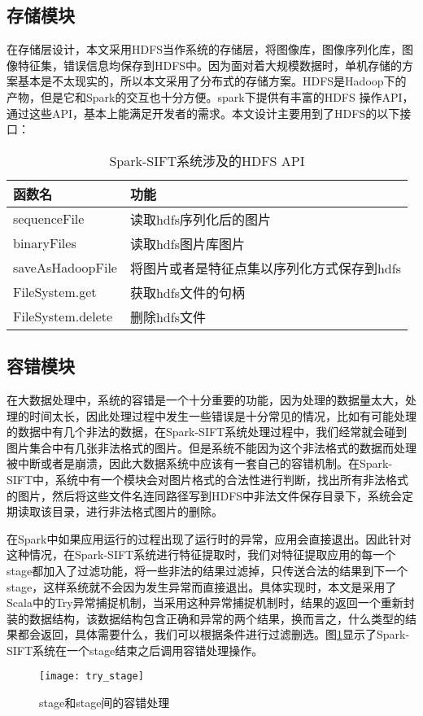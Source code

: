 \subsection{存储模块}
在存储层设计，本文采用HDFS当作系统的存储层，将图像库，图像序列化库，图像特征集，错误信息均保存到HDFS中。因为面对着大规模数据时，单机存储的方案基本是不太现实的，所以本文采用了分布式的存储方案。HDFS是Hadoop下的产物，但是它和Spark的交互也十分方便。spark下提供有丰富的HDFS 操作API，通过这些API，基本上能满足开发者的需求。本文设计主要用到了HDFS的以下接口：
\begin{table}[h] %
\caption{Spark-SIFT系统涉及的HDFS API} %
\centering
\label{tab:HDFS_API}
\begin{tabular}{p{3cm}|p{8cm}} %
\hline
\hline
函数名  &  功能 \\ %
\hline %
sequenceFile   & 读取hdfs序列化后的图片\\
\hline
binaryFiles   & 读取hdfs图片库图片\\
\hline
saveAsHadoopFile  & 将图片或者是特征点集以序列化方式保存到hdfs\\
\hline
FileSystem.get & 获取hdfs文件的句柄\\
\hline
FileSystem.delete & 删除hdfs文件\\
\hline
\hline
\end{tabular}
\end{table}
\subsection{容错模块}
在大数据处理中，系统的容错是一个十分重要的功能，因为处理的数据量太大，处理的时间太长，因此处理过程中发生一些错误是十分常见的情况，比如有可能处理的数据中有几个非法的数据，在Spark-SIFT系统处理过程中，我们经常就会碰到图片集合中有几张非法格式的图片。但是系统不能因为这个非法格式的数据而处理被中断或者是崩溃，因此大数据系统中应该有一套自己的容错机制。在Spark-SIFT中，系统中有一个模块会对图片格式的合法性进行判断，找出所有非法格式的图片，然后将这些文件名连同路径写到HDFS中非法文件保存目录下，系统会定期读取该目录，进行非法格式图片的删除。

在Spark中如果应用运行的过程出现了运行时的异常，应用会直接退出。因此针对这种情况，在Spark-SIFT系统进行特征提取时，我们对特征提取应用的每一个stage都加入了过滤功能，将一些非法的结果过滤掉，只传送合法的结果到下一个stage，这样系统就不会因为发生异常而直接退出。具体实现时，本文是采用了Scala中的Try异常捕捉机制，当采用这种异常捕捉机制时，结果的返回一个重新封装的数据结构，该数据结构包含正确和异常的两个结果，换而言之，什么类型的结果都会返回，具体需要什么，我们可以根据条件进行过滤删选。图\ref{fig:try_stage}显示了Spark-SIFT系统在一个stage结束之后调用容错处理操作。
\begin{figure}[htp]
\centering
\texttt{[image: try\_stage]}
\caption{stage和stage间的容错处理}
\label{fig:try_stage}
\end{figure}
